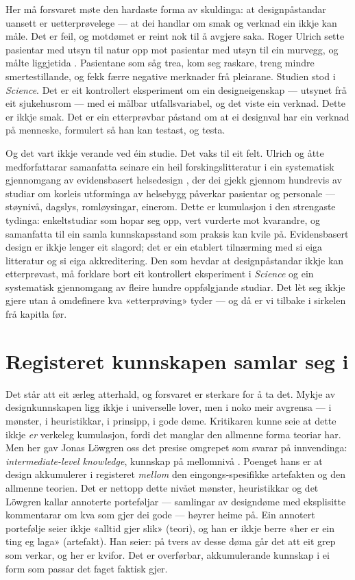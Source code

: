 Her må forsvaret møte den hardaste forma av skuldinga: at designpåstandar uansett er uetterprøvelege — at dei handlar om smak og verknad ein ikkje kan måle. Det er feil, og motdømet er reint nok til å avgjere saka. Roger Ulrich sette pasientar med utsyn til natur opp mot pasientar med utsyn til ein murvegg, og målte liggjetida \autocite{ulrich1984view}. Pasientane som såg trea, kom seg raskare, treng mindre smertestillande, og fekk færre negative merknader frå pleiarane. Studien stod i \textit{Science}. Det er eit kontrollert eksperiment om ein designeigenskap — utsynet frå eit sjukehusrom — med ei målbar utfallsvariabel, og det viste ein verknad. Dette er ikkje smak. Det er ein etterprøvbar påstand om at ei designval har ein verknad på menneske, formulert så han kan testast, og testa.

Og det vart ikkje verande ved éin studie. Det vaks til eit felt. Ulrich og åtte medforfattarar samanfatta seinare ein heil forskingslitteratur i ein systematisk gjennomgang av evidensbasert helsedesign \autocite{ulrich2008ebd}, der dei gjekk gjennom hundrevis av studiar om korleis utforminga av helsebygg påverkar pasientar og personale — støynivå, dagslys, romløysingar, einerom. Dette er kumulasjon i den strengaste tydinga: enkeltstudiar som hopar seg opp, vert vurderte mot kvarandre, og samanfatta til ein samla kunnskapsstand som praksis kan kvile på. Evidensbasert design er ikkje lenger eit slagord; det er ein etablert tilnærming med si eiga litteratur og si eiga akkreditering. Den som hevdar at designpåstandar ikkje kan etterprøvast, må forklare bort eit kontrollert eksperiment i \textit{Science} og ein systematisk gjennomgang av fleire hundre oppfølgjande studiar. Det lèt seg ikkje gjere utan å omdefinere kva «etterprøving» tyder — og då er vi tilbake i sirkelen frå kapitla før.

\section{Registeret kunnskapen samlar seg i}

Det står att eit ærleg atterhald, og forsvaret er sterkare for å ta det. Mykje av designkunnskapen ligg ikkje i universelle lover, men i noko meir avgrensa — i mønster, i heuristikkar, i prinsipp, i gode døme. Kritikaren kunne seie at dette ikkje \emph{er} verkeleg kumulasjon, fordi det manglar den allmenne forma teoriar har. Men her gav Jonas Löwgren oss det presise omgrepet som svarar på innvendinga: \emph{intermediate-level knowledge}, kunnskap på mellomnivå \autocite{lowgren2013intermediate}. Poenget hans er at design akkumulerer i registeret \emph{mellom} den eingongs-spesifikke artefakten og den allmenne teorien. Det er nettopp dette nivået mønster, heuristikkar og det Löwgren kallar annoterte porteføljar — samlingar av designdøme med eksplisitte kommentarar om kva som gjer dei gode — høyrer heime på. Ein annotert portefølje seier ikkje «alltid gjer slik» (teori), og han er ikkje berre «her er ein ting eg laga» (artefakt). Han seier: på tvers av desse døma går det att eit grep som verkar, og her er kvifor. Det er overførbar, akkumulerande kunnskap i ei form som passar det faget faktisk gjer.

